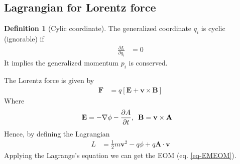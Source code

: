 \documentclass[twoside,11pt]{article}
\numberwithin{equation}{section} %
\newcommand{\lms}{\fontfamily{lmss}\selectfont} %
\theoremstyle{definition}
\newtheorem{definition}{\lms Definition}[section]
\theoremstyle{remark}
\begin{document}
\subsection{Lagrangian for Lorentz force}
\begin{definition}[Cylic coordinate]
The generalized coordinate $q_i$ is cyclic (ignorable) if 
\begin{align}
    \frac{\partial L}{\partial q_i} &= 0
\end{align}
It implies the generalized momentum $p_i$ is conserved.
\end{definition}
The Lorentz force is given by
\begin{align}
    \mathbf{F} &= 
    q[\mathbf{E} + \mathbf{v}\times\mathbf{B}]
    \label{eq-EMEOM}
\end{align}
Where
\begin{align}
    \mathbf{E} &= -\nabla\phi - \frac{\partial A}{\partial t},\enskip
    \mathbf{B} = \mathbf{v}\times\mathbf{A}
\end{align}
Hence, by defining the Lagrangian
\begin{align}
    L &= 
    \frac{1}{2}m\mathbf{v}^2 - q\phi + q\mathbf{A}\cdot\mathbf{v}
\end{align}
Applying the Lagrange's equation we can get the EOM (eq. \ref{eq-EMEOM}).
\end{document}
